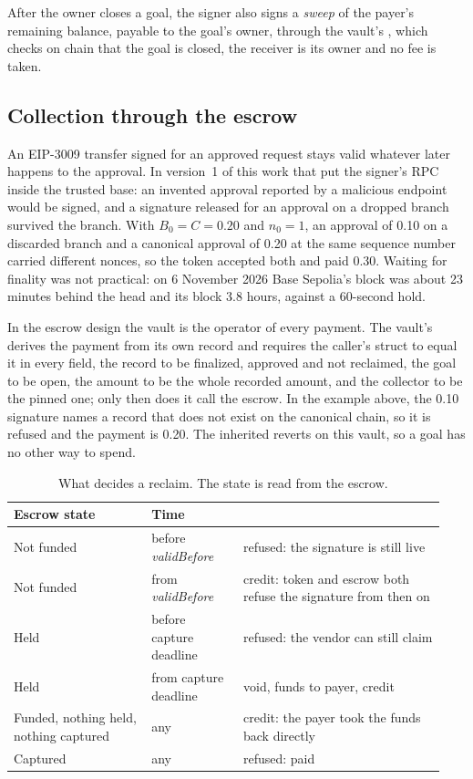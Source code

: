 After the owner closes a goal, the signer also signs a \emph{sweep} of the payer's remaining balance, payable to the goal's
owner, through the vault's , which checks on chain that the goal is closed, the receiver is its owner and no fee is
taken.

\subsection{Collection through the escrow}
\label{sec:escrow}

An EIP-3009 transfer signed for an approved request stays valid whatever later happens to the approval. In version~1 of this work
that put the signer's RPC inside the trusted base: an invented approval reported by a malicious endpoint would be signed, and a
signature released for an approval on a dropped branch survived the branch. With $B_0 = C = 0.20$ and $n_0 = 1$, an approval of
0.10 on a discarded branch and a canonical approval of 0.20 at the same sequence number carried different nonces, so the token
accepted both and paid 0.30. Waiting for finality was not practical: on 6 November 2026 Base Sepolia's  block was about
23 minutes behind the head and its  block 3.8 hours, against a 60-second hold.

In the escrow design the vault is the operator of every payment. The vault's  derives the payment from its own record
and requires the caller's struct to equal it in every field, the record to be finalized, approved and not reclaimed, the goal to be open,
the amount to be the whole recorded amount, and the collector to be the pinned one; only then does it call the escrow. In the example
above, the 0.10 signature names a record that does not exist on the canonical chain, so it is refused and the payment is 0.20. The
inherited  reverts on this vault, so a goal has no other way to spend.

\begin{table}[t]
\centering\small
\begin{tabular}{@{}L{0.3\linewidth}L{0.2\linewidth}L{0.44\linewidth}@{}}
\toprule
Escrow state & Time &  \\
\midrule
Not funded & before \textit{validBefore} & refused: the signature is still live \\
Not funded & from \textit{validBefore} & credit: token and escrow both refuse the signature from then on \\
Held & before capture deadline & refused: the vendor can still claim \\
Held & from capture deadline & void, funds to payer, credit \\
Funded, nothing held, nothing captured & any & credit: the payer took the funds back directly \\
Captured & any & refused: paid \\
\bottomrule
\end{tabular}
\caption{What decides a reclaim. The state is read from the escrow.}
\label{tab:reclaim}
\end{table}

